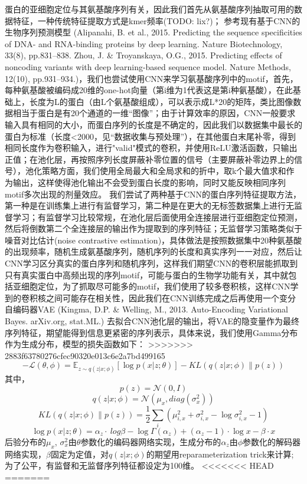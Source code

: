 \documentclass[a4paper,UTF8]{article}
\begin{document}
蛋白的亚细胞定位与其氨基酸序列有关，因此我们首先从氨基酸序列抽取可用的数据特征，一种传统特征提取方式是kmer频率(TODO: lix?)；
参考现有基于CNN的生物序列预测模型 (Alipanahi, B. et al., 2015. Predicting the sequence specificities of DNA- and RNA-binding proteins by deep learning. Nature Biotechnology, 33(8), pp.831–838. Zhou, J. & Troyanskaya, O.G., 2015. Predicting effects of noncoding variants with deep learning-based sequence model. Nature Methods, 12(10), pp.931–934.)，我们也尝试使用CNN来学习氨基酸序列中的motif，首先，每种氨基酸被编码成20维的one-hot向量（第i维为1代表这是第i种氨基酸），在此基础上，长度为L的蛋白（由L个氨基酸组成），可以表示成L*20的矩阵，类比图像数据相当于蛋白是有20个通道的一维“图像”；由于计算效率的原因，CNN一般要求输入具有相同的大小，而蛋白序列的长度是不确定的，因此我们以数据集中最长的蛋白为标准（长度<2000，见“数据收集与预处理”），在其他蛋白末尾补零，得到相同长度作为卷积输入，进行"valid"模式的卷积，并使用ReLU激活函数，只输出正值；在池化层，再按照序列长度屏蔽补零位置的信号（主要屏蔽补零边界上的信号），池化策略方面，我们使用全局最大和全局求和的折中，取k个最大值求和作为输出，这样使得池化输出不会受到蛋白长度的影响，同时又能反映相同序列motif多次出现的剂量效应。
我们尝试了两种基于CNN的蛋白序列特征提取方法，第一种是在训练集上进行有监督学习，第二种是在更大的无标签数据集上进行无监督学习；有监督学习比较常规，在池化层后面使用全连接层进行亚细胞定位预测，然后将倒数第二个全连接层的输出作为提取到的序列特征；无监督学习策略类似于噪音对比估计(noise contrastive estimation)，具体做法是按照数据集中20种氨基酸的出现频率，随机生成氨基酸序列，随机序列的长度和真实序列一一对应，然后让CNN学习区分真实的蛋白序列和随机序列，这样我们期望CNN的卷积层能抓取到只有真实蛋白中高频出现的序列motif，可能与蛋白的生物学功能有关，其中就包括亚细胞定位，为了抓取尽可能多的motif，我们使用了较多卷积核，这样CNN学到的卷积核之间可能存在相关性，因此我们在CNN训练完成之后再使用一个变分自编码器VAE (Kingma, D.P. & Welling, M., 2013. Auto-Encoding Variational Bayes. arXiv.org, stat.ML.) 去拟合CNN池化层的输出，将VAE的隐变量作为最终序列特征，期望能得到信息更紧密的序列表示，具体来说，我们使用Gamma分布作为生成分布，模型的损失函数如下：
>>>>>>> 2883f63780276cfec90320e013c6e2a7bd499165
$$-\mathcal L(\theta, \phi) = \mathbb E_{z \sim q(z|x;\phi)} [\log p(x|z;\theta)] - KL(q(z|x;\phi) \parallel p(z))$$
其中，
$$p(z)=\mathcal N(0, I)$$
$$q(z|x;\phi)=\mathcal N(\mu_x, diag(\sigma_x^2))$$
$$KL(q(z|x;\phi) \parallel p(z)) = \frac 1 2 \sum_i (\mu_{i,x}^2 + \sigma_{i,x}^2 - \log \sigma_{i,x}^2 - 1)$$
$$\log p(x|z;\theta)=\alpha_z \cdot\ log \beta - \log \Gamma(\alpha_z) + (\alpha_z - 1) \cdot \log x - \beta \cdot x$$
后验分布的$\mu_x$, $\sigma_x^2$由$\theta$参数化的编码器网络实现，生成分布的$\alpha_z$由$\phi$参数化的解码器网络实现，$\beta$固定为定值，对$q(z|x;\phi)$的期望用reparameterization trick来计算;
为了公平，有监督和无监督序列特征都设定为100维。
<<<<<<< HEAD
=======
\end{document}
